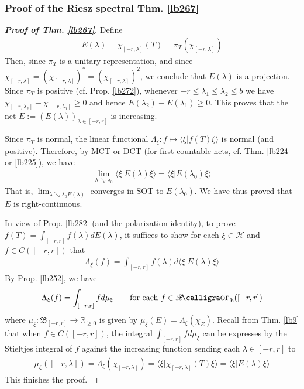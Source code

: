 \documentclass[12pt,b5paper,notitlepage]{article}
\theoremstyle{definition}
\theoremstyle{plain}
\DeclareMathOperator{\Borb}{{\mathscr{B}\text{\kern -2pt {\calligra\large or}}\,}_{\mathrm b}}
\newcommand{\fk}{\mathfrak}
\newcommand{\bk}[1]{\langle {#1}\rangle}
\newcommand{\Rbb}{\mathbb R}
\newcommand{\MH}{\mathcal H}
\numberwithin{equation}{section}
\begin{document}
\subsubsection{Proof of the Riesz spectral Thm. \ref{lb267}}\label{lb289}


\begin{proof}[\textbf{Proof of Thm. \ref{lb267}}]
Define
\begin{align*}
E(\lambda)=\chi_{[-r,\lambda]}(T)=\pi_T(\chi_{[-r,\lambda]})
\end{align*}
Then, since $\pi_T$ is a unitary representation, and since $\chi_{[-r,\lambda]}=(\chi_{[-r,\lambda]})^*=(\chi_{[-r,\lambda]})^2$, we conclude that $E(\lambda)$ is a projection. Since $\pi_T$ is positive (cf. Prop. \ref{lb272}), whenever $-r\leq\lambda_1\leq\lambda_2\leq b$ we have $\chi_{[-r,\lambda_2]}-\chi_{[-r,\lambda_1]}\geq0$ and hence $E(\lambda_2)-E(\lambda_1)\geq0$. This proves that the net $E:=(E(\lambda))_{\lambda\in[-r,r]}$ is increasing. 

Since $\pi_T$ is normal, the linear functional $\Lambda_\xi:f\mapsto\bk{\xi|f(T)\xi}$ is normal (and positive). Therefore, by MCT or DCT (for first-countable nets, cf. Thm. \ref{lb224} or \ref{lb225}), we have
\begin{align*}
\lim_{\lambda\searrow\lambda_0}\bk{\xi|E(\lambda)\xi}=\bk{\xi|E(\lambda_0)\xi}
\end{align*}
That is, $\lim_{\lambda\searrow\lambda_0 E(\lambda)}$ converges in SOT to $E(\lambda_0)$. We have thus proved that $E$ is right-continuous.


In view of Prop. \ref{lb282} (and the polarization identity), to prove $f(T)=\int_{[-r,r]}f(\lambda)dE(\lambda)$, it suffices to show for each $\xi\in\MH$ and $f\in C([-r,r])$ that
\begin{align*}
\Lambda_\xi(f)=\int_{[-r,r]}f(\lambda)d\bk{\xi|E(\lambda)\xi}
\end{align*}
By Prop. \ref{lb252}, we have
\begin{align*}
\Lambda_\xi(f)=\int_{[-r,r]}fd\mu_\xi\qquad\text{for each }f\in\Borb([-r,r])
\end{align*}
where $\mu_\xi:\fk B_{[-r,r]}\rightarrow\Rbb_{\geq0}$ is given by $\mu_\xi(E)=\Lambda_\xi(\chi_E)$. Recall from Thm. \ref{lb9} that when $f\in C([-r,r])$, the integral $\int_{[-r,r]}fd\mu_\xi$ can be expresses by the Stieltjes integral of $f$ against the increasing function sending each $\lambda\in[-r,r]$ to
\begin{align*}
\mu_\xi([-r,\lambda])=\Lambda_\xi(\chi_{[-r,\lambda]})=\bk{\xi|\chi_{[-r,\lambda]}(T)\xi}=\bk{\xi|E(\lambda)\xi}
\end{align*}
This finishes the proof.
\end{proof}
\end{document}
